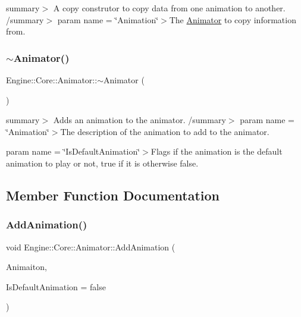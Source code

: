summary$>$ A copy construtor to copy data from one animation to another. /summary$>$ param name = \char`\"{}\+Animation\char`\"{}$>$The \hyperlink{class_engine_1_1_core_1_1_animator}{Animator} to copy information from.\mbox{\label{class_engine_1_1_core_1_1_animator_a5eb5382d793dc2d27b9049cb7f91aa63}} 
\subsubsection{\texorpdfstring{$\sim$\+Animator()}{~Animator()}}
{\footnotesize\ttfamily Engine\+::\+Core\+::\+Animator\+::$\sim$\+Animator (\begin{DoxyParamCaption}{ }\end{DoxyParamCaption})}

summary$>$ Adds an animation to the animator. /summary$>$ param name = \char`\"{}\+Animation\char`\"{}$>$The description of the animation to add to the animator.

param name = \char`\"{}\+Is\+Default\+Animation\char`\"{}$>$Flags if the animation is the default animation to play or not, true if it is otherwise false.

\subsection{Member Function Documentation}
\mbox{\label{class_engine_1_1_core_1_1_animator_afebfde85efb9f5fafc32fa4103bb8e44}} 
\subsubsection{\texorpdfstring{Add\+Animation()}{AddAnimation()}}
{\footnotesize\ttfamily void Engine\+::\+Core\+::\+Animator\+::\+Add\+Animation (\begin{DoxyParamCaption}\item[{\hyperlink{struct_engine_1_1_core_1_1_animation_information}{Animation\+Information}}]{Animaiton,  }\item[{bool}]{Is\+Default\+Animation = {\ttfamily false} }\end{DoxyParamCaption})}

